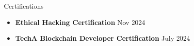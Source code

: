 \documentclass{resume} %
\begin{document}
\begin{rSection}{Certifications}
    \begin{itemize}

        \item \textbf{Ethical Hacking Certification} \hfill Nov 2024


        \item \textbf{TechA Blockchain Developer Certification} \hfill July 2024





\end{itemize}
\end{rSection}
\end{document}
